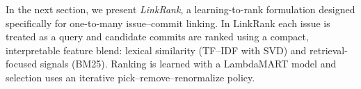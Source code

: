 \noindent
In the next section, we present \emph{LinkRank}, a learning-to-rank formulation designed specifically for one-to-many issue--commit linking. In LinkRank each issue is treated as a query and candidate commits are ranked using a compact, interpretable feature blend: lexical similarity (TF--IDF with SVD) and retrieval-focused signals (BM25). Ranking is learned with a LambdaMART model and selection uses an iterative pick--remove--renormalize policy. 







